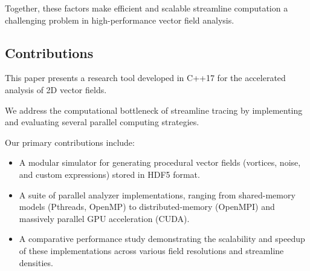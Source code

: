 Together, these factors make efficient and scalable streamline computation a challenging problem in high-performance vector field analysis.


\subsection{Contributions}

This paper presents a research tool developed in C++17 for the accelerated analysis of 2D vector fields.

We address the computational bottleneck of streamline tracing by implementing and evaluating several parallel computing strategies.

Our primary contributions include:
\begin{itemize}
	\item A modular simulator for generating procedural vector fields (vortices, noise, and custom expressions) stored in HDF5 format.
	\item A suite of parallel analyzer implementations, ranging from shared-memory models (Pthreads, OpenMP) to distributed-memory (OpenMPI) and massively parallel GPU acceleration (CUDA).
	\item A comparative performance study demonstrating the scalability and speedup of these implementations across various field resolutions and streamline densities.
\end{itemize}

